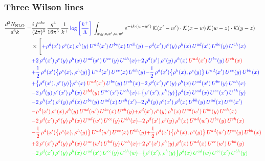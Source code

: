 \documentclass[9pt]{article}
\numberwithin{equation}{section}
\begin{document}
\subsubsection{Three Wilson lines}
\begin{align}
    \frac{d^{3}N_{\rm NLO}}{d^{3}k}= & \frac{i\,f^{abc}}{(2\pi)^{3}}\,\frac{g^{4}}{16\pi^{5}}\,\frac{1}{k^{+}}\,{\color{blue}\log{\left[\frac{k^{+}}{\Lambda}\right]}}\,\int_{x,y,z,x',w,w'}e^{-ik\cdot (w-w')}\,\mathcal{K}(x'-w')\cdot\mathcal{K}(x-w)\,\mathcal{K}(w-z)\cdot\mathcal{K}(y-z)\notag \\ & \times\Bigg[{\color{blue}+\rho^{d}(x')\,\rho^{e}(x)\,\rho^{h}(y)\,U^{ad}(x')\,U^{be}(x)\,U^{ch}(y)}\,{\color{blue}-\rho^{d}(x')\,\rho^{e}(y)\,\rho^{h}(x)\,U^{ad}(x')\,U^{be}(y)\,U^{ch}(x)}\notag \\ &{\color{blue}+2\,\rho^{d}(x')\,\rho^{e}(y)\,\rho^{h}(x)\,U^{ad}(x')\,U^{ce}(y)\,U^{bh}(x)}{\color{blue}+2\,\rho^{d}(x')\,\rho^{e}(y)\,\rho^{h}(x)\, {\color{red}U^{ad}(x')}\,U^{be}(y)\,{\color{red}U^{ch}(x)}}\notag \\ & {\color{blue}+\frac{1}{2}\,\rho^{d}(x')\big\{\rho^{e}(x),\rho^{h}(y)\big\}\,U^{ad}(x')\,U^{ce}(x)\,U^{bh}(y)}{\color{blue}-\frac{1}{2}\,\rho^{d}(x')\big\{\rho^{h}(x),\rho^{e}(y)\big\}\,U^{ad}(x')\,U^{ce}(y)\,U^{bh}(x)}\notag \\ & {\color{blue}+\big\{\rho^{d}(x'),\rho^{e}(y)\big\}\rho^{h}(x)\,{\color{red}U^{ad}(x')}\,U^{be}(y)\,U^{ch}(x)}{\color{blue}-2\,\rho^{d}(x')\,\rho^{e}(y)\, \rho^{h}(x)\, U^{ad}(x')\,U^{be}(y)\,U^{ch}(x)}\notag \\ &{\color{blue}-2\,\rho^{d}(y)\,\rho^{e}(x')\, \rho^{h}(x)\, {\color{red}U^{bd}(y)}\,U^{ae}(x')\,U^{ch}(x)}{\color{blue}+\big\{\rho^{e}(x'),\rho^{h}(y)\big\}\rho^{d}(x)\,U^{ad}(x)\,U^{ce}(x')\,U^{bh}(y)}\notag \\ & {\color{blue}-2\,\rho^{h}(x')\,\rho^{e}(y)\,\rho^{d}(x)\,U^{be}(y)\,U^{ad}(x)\,U^{ch}(x')}{\color{blue}-2\,\rho^{h}(y)\,\rho^{e}(x')\,\rho^{d}(x)\,U^{bh}(y)\,U^{ad}(x)\,U^{ce}(x')}\notag \\ & {\color{red}-\rho^{d}(x')\,\rho^{e}(x)\,\rho^{h}(y)\,U^{ad}(w')\,U^{be}(x)\,U^{ch}(y)}{\color{red}+\rho^{d}(x')\,\rho^{e}(y)\,\rho^{h}(x)\,U^{ad}(w')\,U^{be}(y)\,U^{ch}(x)}\notag \\ &{\color{red}-2\,\rho^{d}(x')\,\rho^{e}(y)\,\rho^{h}(x)\,U^{ad}(w')\,U^{ce}(y)\,U^{bh}(x)} {\color{red}-2\,\rho^{d}(x')\,\rho^{e}(y)\,\rho^{h}(x)\, {\color{red}U^{ad}(w')}\,U^{be}(y)\,{\color{red}U^{ch}(x)}}\notag \\ & {\color{red}-\frac{1}{2}\,\rho^{d}(x')\big\{\rho^{e}(x),\rho^{h}(y)\big\}\,U^{ad}(w')\,U^{ce}(x)\,U^{bh}(y)}{\color{red}+\frac{1}{2}\,\rho^{d}(x')\big\{\rho^{h}(x),\rho^{e}(y)\big\}\,U^{ad}(w')\,U^{ce}(y)\,U^{bh}(x)}\notag \\ & {\color{red}+2\,\rho^{e}(x')\,\rho^{d}(y)\, \rho^{h}(x)\, U^{ae}(w')\,U^{bd}(y)\,U^{ch}(x)}{\color{red}+2\,\rho^{e}(x')\,\rho^{h}(y)\,\rho^{d}(x)\,U^{ad}(x)\,U^{ce}(w')\,U^{bh}(y)}\notag \\ & {\color{green}-2\,\rho^{d}(x')\,\rho^{e}(y)\,\rho^{h}(x)\,U^{ad}(x')\,U^{ce}(y)\,U^{bh}(w)}{\color{green}-\big\{\rho^{e}(x'),\rho^{h}(y)\big\}\rho^{d}(x)\,U^{ad}(w)\,U^{ce}(x')\,U^{bh}(y)}\notag \\ & 
\end{align}
\end{document}

